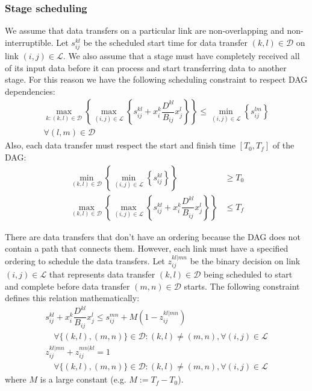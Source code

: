 \subsubsection*{Stage scheduling}

We assume that data transfers on a particular link are non-overlapping and non-interruptible.
Let $s_{ij}^{kl}$ be the scheduled start time for data transfer $(k,l)\in\mathcal{D}$ on link $(i,j)\in\mathcal{L}$.
We also assume that a stage must have completely received all of its input data before it can process and start transferring data to another stage.
For this reason we have the following scheduling constraint to respect DAG dependencies:
\begin{align}
	 \max_{k:(k,l)\in\mathcal{D}}\left\{\max_{(i,j)\in\mathcal{L}}\left\{s_{ij}^{kl}+x_{i}^k\dfrac{D^{kl}}{B_{ij}}x_{j}^l\right\}\right\} \leq \min_{(i,j)\in\mathcal{L}}\left\{s_{ij}^{lm}\right\} \nonumber \\
	 \forall(l,m)\in\mathcal{D} \label{eq:DAG_stage_start}
\end{align}
Also, each data transfer must respect the start and finish time $[T_0,T_f]$ of the DAG:
\begin{subequations}\label{eq:DAG_deadline}
	\begin{align}
		\min_{(k,l)\in\mathcal{D}}\left\{\min_{(i,j)\in\mathcal{L}}\left\{s_{ij}^{kl}\right\}\right\} & \geq T_0 \\
		\max_{(k,l)\in\mathcal{D}}\left\{\max_{(i,j)\in\mathcal{L}}\left\{s_{ij}^{kl}+x_{i}^k\dfrac{D^{kl}}{B_{ij}}x_{j}^l\right\}\right\} & \leq T_f
	\end{align}
\end{subequations}

There are data transfers that don't have an ordering because the DAG does not contain a path that connects them.
However, each link must have a specified ordering to schedule the data transfers.
Let $z_{ij}^{kl|mn}$ be the binary decision on link $(i,j)\in\mathcal{L}$ that represents data transfer $(k,l)\in\mathcal{D}$ being scheduled to start and complete before data transfer $(m,n)\in\mathcal{D}$ starts.
The following constraint defines this relation mathematically:
\begin{subequations}\label{eq:DAG_data_trans_start}
	\begin{align}
		s_{ij}^{kl}+x_{i}^k\dfrac{D^{kl}}{B_{ij}}x_{j}^l \leq s_{ij}^{mn} + M(1-z_{ij}^{kl|mn}) \quad \nonumber \\
		\quad\forall \{(k,l),(m,n)\} \in\mathcal{D}:(k,l)\neq(m,n), \forall(i,j)\in\mathcal{L}\\
		z_{ij}^{kl|mn} + z_{ij}^{mn|kl} = 1 \quad \nonumber\\
		\quad\forall \{(k,l),(m,n)\} \in\mathcal{D}:(k,l)\neq(m,n), \forall(i,j)\in\mathcal{L}
	\end{align}
\end{subequations}
where $M$ is a large constant (e.g. $M:=T_f-T_0$).



